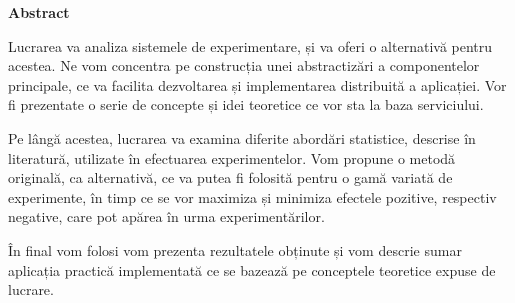 \thispagestyle{plain}

\vspace*{\fill}

\begin{center}
	\Large \textbf{Abstract}	
\end{center}

Lucrarea va analiza sistemele de experimentare, și va oferi o alternativă pentru acestea. Ne vom concentra pe construcția unei abstractizări a componentelor principale, ce va facilita dezvoltarea și implementarea distribuită a aplicației. Vor fi prezentate o serie de concepte și idei teoretice ce vor sta la baza serviciului.

Pe lângă acestea, lucrarea va examina diferite abordări statistice, descrise în literatură, utilizate în efectuarea experimentelor. Vom propune o metodă originală, ca alternativă, ce va putea fi folosită pentru o gamă variată de experimente, în timp ce se vor maximiza și minimiza efectele pozitive, respectiv negative, care pot apărea în urma experimentărilor.

În final vom folosi vom prezenta rezultatele obținute și vom descrie sumar aplicația practică implementată ce se bazează pe conceptele teoretice expuse de lucrare.

\vspace*{\fill}
